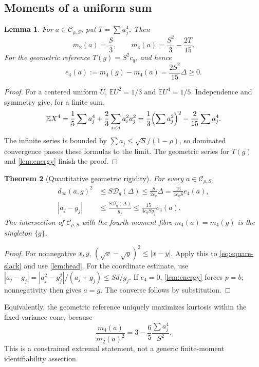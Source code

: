 \documentclass[11pt,a4paper]{article}
\numberwithin{equation}{section}
\newtheorem{theorem}{Theorem}[section]
\newtheorem{lemma}[theorem]{Lemma}
\theoremstyle{definition}
\theoremstyle{remark}
\newcommand{\E}{\mathbb E}
\newcommand{\C}{\mathcal C}
\begin{document}
\subsection{Moments of a uniform sum}

\begin{lemma}
\label{lem:moments}
For $a\in\C_{\rho,S}$, put $T=\sum a_j^4$. Then
\begin{equation}
 m_2(a)=\frac S3,\qquad
 m_4(a)=\frac{S^2}{3}-\frac{2T}{15}.
 \label{eq:moments}
\end{equation}
For the geometric reference $T(g)=S^2c_q$, and hence
\begin{equation}
 e_4(a):=m_4(g)-m_4(a)=\frac{2S^2}{15}\Delta\ge0.
 \label{eq:moment-deficit}
\end{equation}
\end{lemma}
\begin{proof}
For a centered uniform $U$, $\E U^2=1/3$ and $\E U^4=1/5$.
Independence and symmetry give, for a finite sum,
\[
 \E X^4=\frac15\sum a_j^4+\frac23\sum_{i<j}a_i^2a_j^2
        =\frac13\Bigl(\sum a_j^2\Bigr)^2-\frac2{15}\sum a_j^4.
\]
The infinite series is bounded by $\sum a_j\le\sqrt S/(1-\rho)$,
so dominated convergence passes these formulas to the limit.
The geometric series for $T(g)$ and \cref{lem:energy} finish the proof.
\end{proof}

\begin{theorem}[Quantitative geometric rigidity]
\label{thm:geometric-rigidity}
For every $a\in\C_{\rho,S}$,
\begin{align}
 d_\infty(a,g)^2
 &\le S\mathcal D_q(\Delta)
 \le\frac{S}{2c_q}\Delta
 =\frac{15}{4c_qS}e_4(a), \label{eq:general-rigidity}\\
 |a_j-g_j|
 &\le\frac{S\mathcal D_q(\Delta)}{g_j}
 \le\frac{15}{4c_qSg_j}e_4(a). \label{eq:general-prefix}
\end{align}
The intersection of $\C_{\rho,S}$ with the fourth-moment fibre
$m_4(a)=m_4(g)$ is the singleton $\{g\}$.
\end{theorem}
\begin{proof}
For nonnegative $x,y$, $(\sqrt x-\sqrt y)^2\le|x-y|$.
Apply this to \eqref{eq:square-slack} and use \cref{lem:head}.
For the coordinate estimate, use
$|a_j-g_j|=|a_j^2-g_j^2|/(a_j+g_j)\le Sd/g_j$.
If $e_4=0$, \cref{lem:energy} forces $p=b$; nonnegativity then gives $a=g$.
The converse follows by substitution.
\end{proof}

Equivalently, the geometric reference uniquely maximizes kurtosis within the
fixed-variance cone, because
\[
 \frac{m_4(a)}{m_2(a)^2}=3-\frac65\frac{\sum a_j^4}{S^2}.
\]
This is a constrained extremal statement, not a generic finite-moment
identifiability assertion.
\end{document}
